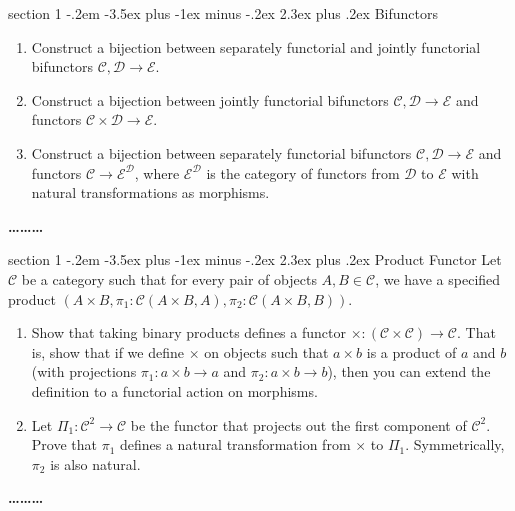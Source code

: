 \documentclass[12pt]{article}
\makeatletter
\newenvironment{problem}{\@startsection
       {section}
       {1}
       {-.2em}
       {-3.5ex plus -1ex minus -.2ex}
       {2.3ex plus .2ex}
       {\pagebreak[3]%
       \large\bf\noindent{Problem }
       }
       }
       {%
       \begin{center}\large\bf \ldots\ldots\ldots\end{center}}
\newcommand{\cat}{\mathcal}
\makeatother
\begin{document}
\begin{problem}{Bifunctors}
  \begin{enumerate}
  \item Construct a bijection between separately functorial and jointly functorial bifunctors $\cat C, \cat D \to \cat E$.
  \item Construct a bijection between jointly functorial bifunctors
    $\cat C, \cat D \to \cat E$ and functors $\cat C \times \cat D \to
    \cat E$.
  \item Construct a bijection between separately functorial bifunctors
    $\cat C, \cat D \to \cat E$ and functors $\cat C \to \cat E^{\cat
    D}$, where $\cat E^{\cat D}$ is the category of functors from
    $\cat D$ to $\cat E$ with natural transformations as morphisms.
  \end{enumerate}
\end{problem}

\begin{problem}{Product Functor}
  Let $\mathcal C$ be a category such that for every pair of objects
  $A,B \in \mathcal C$, we have a specified product $(A \times B ,
  \pi_1 : \mathcal C(A\times B, A), \pi_2 : \mathcal C(A\times B,B))$.
  \begin{enumerate}
  \item Show that taking binary products defines a functor $\times :
    (\cat C \times \cat C) \to \cat C$. That is, show that if we define
    $\times$ on objects such that $a \times b$ is a product of $a$ and
    $b$ (with projections $\pi_1 : a\times b \to a$ and $\pi_2 : a
    \times b \to b$), then you can extend the definition to a
    functorial action on morphisms.
  \item Let $\Pi_1 : \mathcal C^2 \to \mathcal C$ be the functor that
    projects out the first component of $\mathcal C^2$.  Prove that
    $\pi_1$ defines a natural transformation from $\times$ to $\Pi_1$.
    Symmetrically, $\pi_2$ is also natural.
  \end{enumerate}
\end{problem}
\end{document}
